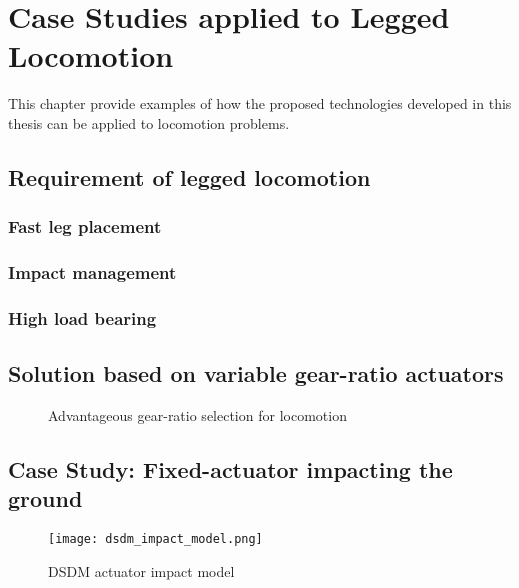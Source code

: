 \chapter{Case Studies applied to Legged Locomotion}
\label{sec:casestudy}

This chapter provide examples of how the proposed technologies developed in this thesis can be applied to locomotion problems.

\section{Requirement of legged locomotion}
\label{sec:case_req}

\subsection{Fast leg placement}
\label{sec:fast}

\subsection{Impact management}
\label{sec:impact}

\subsection{High load bearing}
\label{sec:load}


\section{Solution based on variable gear-ratio actuators}
\label{sec:case_sol}

\begin{figure}[H]
        \centering
        \caption{Advantageous gear-ratio selection for locomotion}\label{fig:legsol}
\end{figure}

\section{Case Study: Fixed-actuator impacting the ground}

\begin{figure}[H]
	\centering
		\texttt{[image: dsdm\_impact\_model.png]}
	\caption{DSDM actuator impact model}
	\label{fig:dsdm_impact_model_1}
\end{figure}



